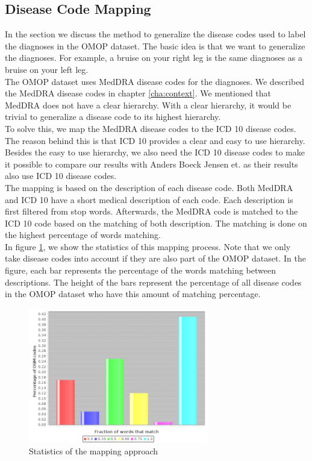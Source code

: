 \subsection{Disease Code Mapping}
\label{sec:mapping}

In the section we discuss the method to generalize the disease codes used to label the diagnoses in the OMOP dataset. The basic idea is that we want to generalize the diagnoses. For example, a bruise on your right leg is the same diagnoses as a bruise on your left leg. \\

The OMOP dataset uses MedDRA disease codes for the diagnoses. We described the MedDRA disease codes in chapter \ref{cha:context}. We mentioned that MedDRA does not have a clear hierarchy. With a clear hierarchy, it would be trivial to generalize a disease code to its highest hierarchy. \\
To solve this, we map the MedDRA disease codes to the ICD 10 disease codes. The reason behind this is that ICD 10 provides a clear and easy to use hierarchy. Besides the easy to use hierarchy, we also need the ICD 10 disease codes to make it possible to compare our results with Anders Boeck Jensen et. \cite{Brunak:article} as their results also use ICD 10 disease codes. \\

The mapping is based on the description of each disease code. Both MedDRA and ICD 10 have a short medical description of each code. Each description is first filtered from stop words. Afterwards, the MedDRA code is matched to the ICD 10 code based on the matching of both description. The matching is done on the highest percentage of words matching. \\

In figure \ref{fig:mappingStats}, we show the statistics of this mapping process. Note that we only take disease codes into account if they are also part of the OMOP dataset. In the figure, each bar represents the percentage of the words matching between descriptions. The height of the bars represent the percentage of all disease codes in the OMOP dataset who have this amount of matching percentage.

\begin{figure}[H]
	\centering
	\includegraphics[width=0.7\textwidth]{mappingStats.jpeg}
	\caption{Statistics of the mapping approach}
	\label{fig:mappingStats}
\end{figure}

